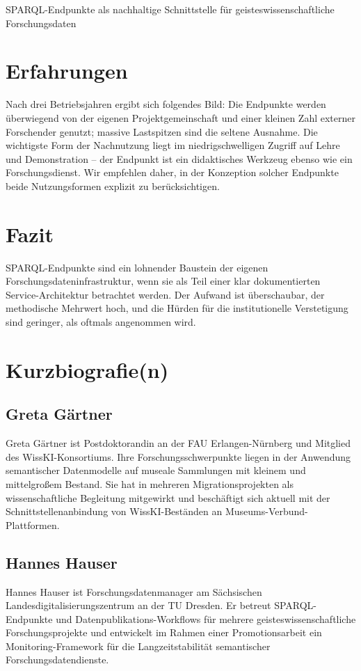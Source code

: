 \begin{beitrag}{SPARQL-Endpunkte als nachhaltige Schnittstelle für geisteswissenschaftliche Forschungsdaten}
\section{Erfahrungen}
Nach drei Betriebsjahren ergibt sich folgendes Bild: Die Endpunkte werden überwiegend von der eigenen Projektgemeinschaft und einer kleinen Zahl externer Forschender genutzt; massive Lastspitzen sind die seltene Ausnahme. Die wichtigste Form der Nachnutzung liegt im niedrigschwelligen Zugriff auf Lehre und Demonstration -- der Endpunkt ist ein didaktisches Werkzeug ebenso wie ein Forschungsdienst. Wir empfehlen daher, in der Konzeption solcher Endpunkte beide Nutzungsformen explizit zu berücksichtigen.

\section{Fazit}
SPARQL-Endpunkte sind ein lohnender Baustein der eigenen Forschungsdateninfrastruktur, wenn sie als Teil einer klar dokumentierten Service-Architektur betrachtet werden. Der Aufwand ist überschaubar, der methodische Mehrwert hoch, und die Hürden für die institutionelle Verstetigung sind geringer, als oftmals angenommen wird.

\end{beitrag}

\section*{Kurzbiografie(n)}

\subsection*{Greta Gärtner}
Greta Gärtner ist Postdoktorandin an der FAU Erlangen-Nürnberg und Mitglied des WissKI-Konsortiums. Ihre Forschungsschwerpunkte liegen in der Anwendung semantischer Datenmodelle auf museale Sammlungen mit kleinem und mittelgroßem Bestand. Sie hat in mehreren Migrationsprojekten als wissenschaftliche Begleitung mitgewirkt und beschäftigt sich aktuell mit der Schnittstellenanbindung von WissKI-Beständen an Museums-Verbund-Plattformen.

\subsection*{Hannes Hauser}
Hannes Hauser ist Forschungsdatenmanager am Sächsischen Landesdigitalisierungszentrum an der TU Dresden. Er betreut SPARQL-Endpunkte und Datenpublikations-Workflows für mehrere geisteswissenschaftliche Forschungsprojekte und entwickelt im Rahmen einer Promotionsarbeit ein Monitoring-Framework für die Langzeitstabilität semantischer Forschungsdatendienste.

